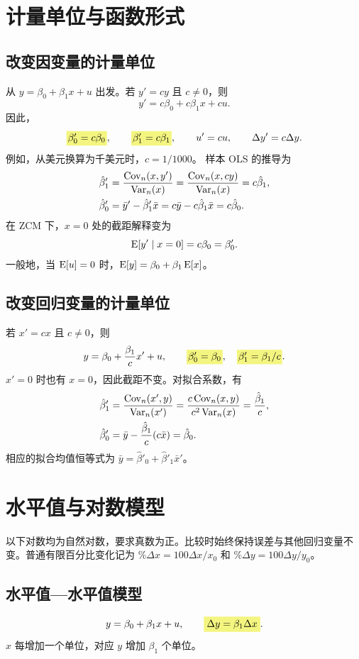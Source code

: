 \section{计量单位与函数形式}
\label{sec:units}
\subsection{改变因变量的计量单位}
从 $y=\beta_0+\beta_1x+u$ 出发。若 $y'=cy$ 且 $c\ne0$，则
\[y'=c\beta_0+c\beta_1x+cu.\]
因此，
\[\hy{$\beta'_0=c\beta_0$},\qquad
\hy{$\beta'_1=c\beta_1$},\qquad u'=cu,\qquad\Delta y'=c\Delta y.\]
例如，从美元换算为千美元时，$c=1/1000$。
样本 OLS 的推导为
\begin{align*}
\hat\beta'_1
 &=\frac{\operatorname{Cov}_n(x,y')}{\operatorname{Var}_n(x)}
 =\frac{\operatorname{Cov}_n(x,cy)}{\operatorname{Var}_n(x)}
 =c\hat\beta_1,\\
\hat\beta'_0
 &=\bar y'-\hat\beta'_1\bar x
 =c\bar y-c\hat\beta_1\bar x=c\hat\beta_0.
\end{align*}
在 ZCM 下，$x=0$ 处的截距解释变为
\[\operatorname{E}[y'\mid x=0]=c\beta_0=\beta'_0.\]
一般地，当 $\operatorname{E}[u]=0$ 时，$\operatorname{E}[y]=\beta_0+\beta_1\operatorname{E}[x]$。

\subsection{改变回归变量的计量单位}
若 $x'=cx$ 且 $c\ne0$，则
\[y=\beta_0+\frac{\beta_1}{c}x'+u,\qquad
\hy{$\beta'_0=\beta_0$},\quad\hy{$\beta'_1=\beta_1/c$}.\]
$x'=0$ 时也有 $x=0$，因此截距不变。对拟合系数，有
\begin{align*}
\hat\beta'_1
 &=\frac{\operatorname{Cov}_n(x',y)}{\operatorname{Var}_n(x')}
 =\frac{c\operatorname{Cov}_n(x,y)}{c^2\operatorname{Var}_n(x)}
 =\frac{\hat\beta_1}{c},\\
\hat\beta'_0&=\bar y-\frac{\hat\beta_1}{c}(c\bar x)=\hat\beta_0.
\end{align*}
相应的拟合均值恒等式为 $\bar y=\hat\beta'_0+\hat\beta'_1\bar x'$。

\section{水平值与对数模型}
\label{sec:logs}
以下对数均为自然对数，要求真数为正。比较时始终保持误差与其他回归变量不变。普通有限百分比变化记为 $\%\Delta x=100\Delta x/x_0$ 和 $\%\Delta y=100\Delta y/y_0$。

\subsection{水平值—水平值模型}
\[y=\beta_0+\beta_1x+u,\qquad
\hm{\Delta y=\beta_1\Delta x}.\]
$x$ 每增加一个单位，对应 $y$ 增加 $\beta_1$ 个单位。

